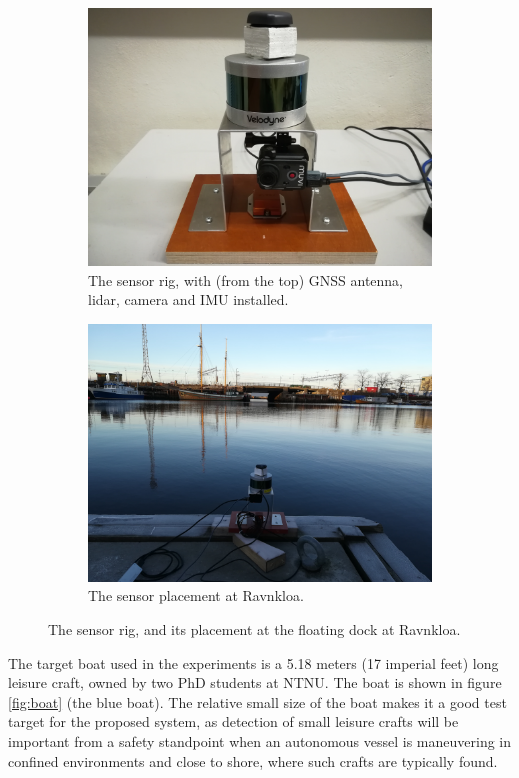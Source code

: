 \begin{figure}[H]
	\centering
	\begin{subfigure}[t]{.5\textwidth}
		\centering
		\includegraphics[width=.8\linewidth]{fig/sensor_rig.jpg}
		\caption{The sensor rig, with (from the top) GNSS antenna, lidar, camera and IMU installed.}
		\label{fig:sub_sensorrig}
	\end{subfigure}%
	\begin{subfigure}[t]{.5\textwidth}
		\centering
		\includegraphics[width=.8\linewidth]{fig/sensors_ravnkloa.jpg}
		\caption{The sensor placement at Ravnkloa.}
		\label{fig:sub_sensor_ravnkloa}
	\end{subfigure}
	\caption{The sensor rig, and its placement at the floating dock at Ravnkloa.}
	\label{fig:sensors_ravnkloa}
\end{figure}
The target boat used in the experiments is a 5.18 meters (17 imperial feet) long  leisure craft, owned by two PhD students at NTNU.
The boat is shown in figure \ref{fig:boat} (the blue boat). The relative small size of the boat makes it a good test target for the proposed system, as detection of small leisure crafts will be important from a safety standpoint when an autonomous vessel is maneuvering in confined environments and close to shore, where such crafts are typically found.
